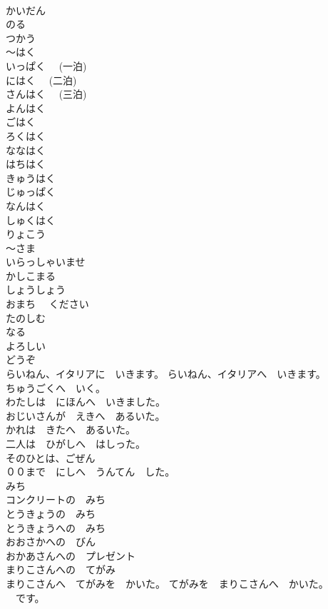 \documentclass[8pt]{extreport}
\begin{document}
\begin{CJK}{UTF8}{min}
\\	かいだん	
\\	のる	
\\	つかう	
\\	～はく	
\\	いっぱく　 (一泊)	
\\	にはく　 (二泊)	
\\	さんはく　 (三泊)	
\\	よんはく	
\\	ごはく	
\\	ろくはく	
\\	ななはく	
\\	はちはく	
\\	きゅうはく	
\\	じゅっぱく	
\\	なんはく	
\\	しゅくはく	
\\	りょこう	
\\	～さま	
\\	いらっしゃいませ	
\\	かしこまる	
\\	しょうしょう	
\\	おまち　 ください	
\\	たのしむ	
\\	なる	
\\	よろしい	
\\	どうぞ	
\\	らいねん、イタリアに　いきます。 らいねん、イタリアへ　いきます。	
\\	ちゅうごくへ　いく。	
\\	わたしは　にほんへ　いきました。	
\\	おじいさんが　えきへ　あるいた。	
\\	かれは　きたへ　あるいた。	
\\	二人は　ひがしへ　はしった。	
\\	そのひとは、ごぜん　
\\	００まで　にしへ　うんてん　した。	
\\	みち	
\\	コンクリートの　みち	
\\	とうきょうの　みち	
\\	とうきょうへの　みち	
\\	おおさかへの　びん	
\\	おかあさんへの　プレゼント	
\\	まりこさんへの　てがみ	
\\	まりこさんへ　てがみを　かいた。 てがみを　まりこさんへ　かいた。	
\\	[まりこさんへの　てがみ]　です。	

\end{CJK}
\end{document}
